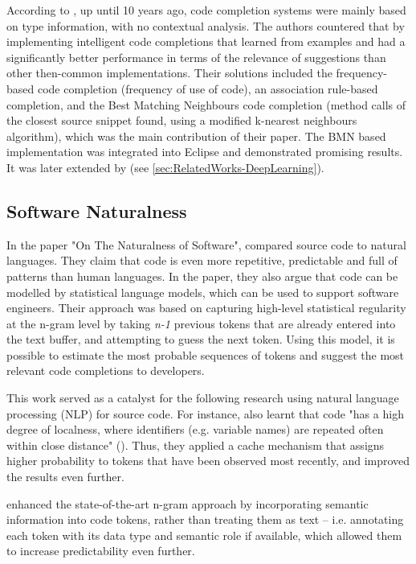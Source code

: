 \documentclass[sigplan,screen]{acmart}
\begin{document}
According to \cite{Bruc09a}, up until 10 years ago, code completion systems were mainly based on type information, with no contextual analysis. The authors countered that by implementing intelligent code completions that learned from examples and had a significantly better performance in terms of the relevance of suggestions than other then-common implementations. Their solutions included the frequency-based code completion (frequency of use of code), an association rule-based completion, and the Best Matching Neighbours code completion (method calls of the closest source snippet found, using a modified k-nearest neighbours algorithm), which was the main contribution of their paper. The BMN based implementation was integrated into Eclipse and demonstrated promising results. It was later extended by \cite{Prok15a} (see \ref{sec:RelatedWorks-DeepLearning}).

\subsection{Software Naturalness}
In the paper "On The Naturalness of Software", \cite{Hind12a} compared source code to natural languages. They claim that code is even more repetitive, predictable and full of patterns than human languages. In the paper, they also argue that code can be modelled by statistical language models, which can be used to support software engineers. Their approach was based on capturing high-level statistical regularity at the n-gram level by taking \textit{n-1} previous tokens that are already entered into the text buffer, and attempting to guess the next token. Using this model, it is possible to estimate the most probable sequences of tokens and suggest the most relevant code completions to developers.

This work served as a catalyst for the following research using natural language processing (NLP) for source code. For instance, \cite{Tu14a} also learnt that code "has a high degree of localness, where identifiers (e.g. variable names) are repeated often within close distance" (\cite{Alla18a}). Thus, they applied a cache mechanism that assigns higher probability to tokens that have been observed most recently, and improved the results even further.

\cite{Nguy13a} enhanced the state-of-the-art n-gram approach by incorporating semantic information into code tokens, rather than treating them as text -- i.e. annotating each token with its data type and semantic role if available, which allowed them to increase predictability even further.
\end{document}
